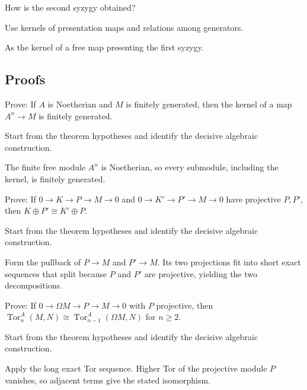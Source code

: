 \begin{exercise}\label{exr:v24-expand-05}
How is the second syzygy obtained?
\end{exercise}
\begin{hint}
Use kernels of presentation maps and relations among generators.
\end{hint}
\begin{solution}
As the kernel of a free map presenting the first syzygy.
\end{solution}

\subsection*{Proofs}

\begin{exercise}\label{exr:v24-expand-06}
Prove: If $A$ is Noetherian and $M$ is finitely generated, then the kernel of a map $A^n\to M$ is finitely generated.
\end{exercise}
\begin{hint}
Start from the theorem hypotheses and identify the decisive algebraic construction.
\end{hint}
\begin{solution}
The finite free module $A^n$ is Noetherian, so every submodule, including the kernel, is finitely generated.
\end{solution}

\begin{exercise}\label{exr:v24-expand-07}
Prove: If $0\to K\to P\to M\to0$ and $0\to K'\to P'\to M\to0$ have projective $P,P'$, then $K\oplus P'\cong K'\oplus P$.
\end{exercise}
\begin{hint}
Start from the theorem hypotheses and identify the decisive algebraic construction.
\end{hint}
\begin{solution}
Form the pullback of $P\to M$ and $P'\to M$. Its two projections fit into short exact sequences that split because $P$ and $P'$ are projective, yielding the two decompositions.
\end{solution}

\begin{exercise}\label{exr:v24-expand-08}
Prove: If $0\to\Omega M\to P\to M\to0$ with $P$ projective, then $\operatorname{Tor}_{n}^A(M,N)\cong\operatorname{Tor}_{n-1}^A(\Omega M,N)$ for $n\ge2$.
\end{exercise}
\begin{hint}
Start from the theorem hypotheses and identify the decisive algebraic construction.
\end{hint}
\begin{solution}
Apply the long exact Tor sequence. Higher Tor of the projective module $P$ vanishes, so adjacent terms give the stated isomorphism.
\end{solution}

